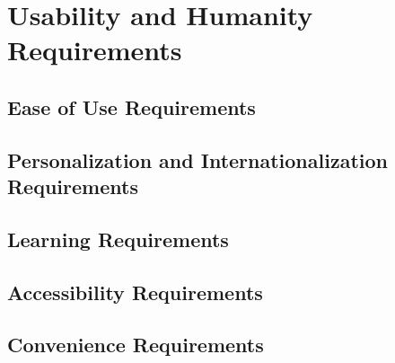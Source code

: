 \chapter{Usability and Humanity Requirements}

\section{Ease of Use Requirements}

\section{Personalization and Internationalization Requirements}

\section{Learning Requirements}

\section{Accessibility Requirements}

\section{Convenience Requirements}